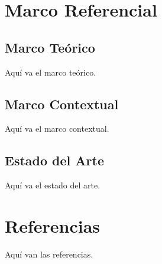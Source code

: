 \documentclass[a4paper,12pt]{report}
\begin{document}
\chapter{Marco Referencial}
\section{Marco Teórico}
Aquí va el marco teórico.

\section{Marco Contextual}
Aquí va el marco contextual.

\section{Estado del Arte}
Aquí va el estado del arte.

\chapter{Referencias}
Aquí van las referencias.
\end{document}
